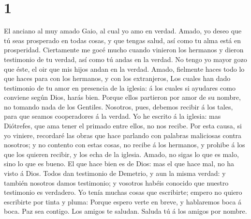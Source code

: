 \hypertarget{section}{%
\section{1}\label{section}}

 El anciano al muy amado Gaio, al cual yo amo en verdad.
 Amado, yo deseo que tú seas prosperado en todas cosas, y
que tengas salud, así como tu alma está en prosperidad. 
Ciertamente me gocé mucho cuando vinieron los hermanos y dieron
testimonio de tu verdad, así como tú andas en la verdad.  No
tengo yo mayor gozo que éste, el oir que mis hijos andan en la verdad.
 Amado, fielmente haces todo lo que haces para con los
hermanos, y con los extranjeros,  Los cuales han dado
testimonio de tu amor en presencia de la iglesia: á los cuales si
ayudares como conviene según Dios, harás bien.  Porque ellos
partieron por amor de su nombre, no tomando nada de los Gentiles.
 Nosotros, pues, debemos recibir á los tales, para que
seamos cooperadores á la verdad.  Yo he escrito á la
iglesia: mas Diótrefes, que ama tener el primado entre ellos, no nos
recibe.  Por esta causa, si yo viniere, recordaré las obras
que hace parlando con palabras maliciosas contra nosotros; y no contento
con estas cosas, no recibe á los hermanos, y prohibe á los que los
quieren recibir, y los echa de la iglesia.  Amado, no sigas
lo que es malo, sino lo que es bueno. El que hace bien es de Dios: mas
el que hace mal, no ha visto á Dios.  Todos dan testimonio
de Demetrio, y aun la misma verdad: y también nosotros damos testimonio;
y vosotros habéis conocido que nuestro testimonio es verdadero.
 Yo tenía muchas cosas que escribirte; empero no quiero
escribirte por tinta y pluma:  Porque espero verte en
breve, y hablaremos boca á boca. Paz sea contigo. Los amigos te saludan.
Saluda tú á los amigos por nombre.
